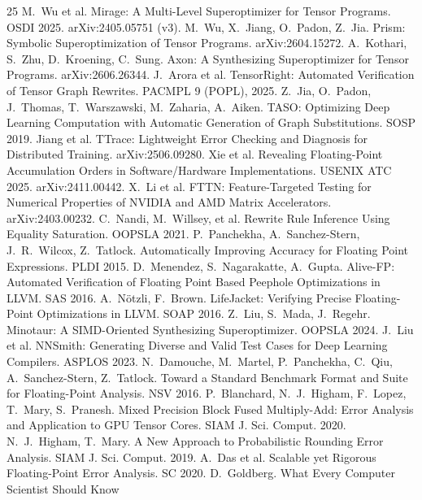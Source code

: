 \documentclass[twocolumn,10pt]{article}
\begin{document}
\begin{thebibliography}{25}
 M.~Wu et al. Mirage: A Multi-Level Superoptimizer for
Tensor Programs. OSDI 2025. arXiv:2405.05751 (v3).
 M.~Wu, X.~Jiang, O.~Padon, Z.~Jia. Prism: Symbolic
Superoptimization of Tensor Programs. arXiv:2604.15272.
 A.~Kothari, S.~Zhu, D.~Kroening, C.~Sung. Axon: A
Synthesizing Superoptimizer for Tensor Programs. arXiv:2606.26344.
 J.~Arora et al. TensorRight: Automated Verification
of Tensor Graph Rewrites. PACMPL 9 (POPL), 2025.
 Z.~Jia, O.~Padon, J.~Thomas, T.~Warszawski, M.~Zaharia,
A.~Aiken. TASO: Optimizing Deep Learning Computation with Automatic
Generation of Graph Substitutions. SOSP 2019.
 Jiang et al. TTrace: Lightweight Error Checking and
Diagnosis for Distributed Training. arXiv:2506.09280.
 Xie et al. Revealing Floating-Point Accumulation Orders in
Software/Hardware Implementations. USENIX ATC 2025. arXiv:2411.00442.
 X.~Li et al. FTTN: Feature-Targeted Testing for Numerical
Properties of NVIDIA and AMD Matrix Accelerators. arXiv:2403.00232.
 C.~Nandi, M.~Willsey, et al. Rewrite Rule Inference Using
Equality Saturation. OOPSLA 2021.
 P.~Panchekha, A.~Sanchez-Stern, J.~R.~Wilcox, Z.~Tatlock.
Automatically Improving Accuracy for Floating Point Expressions. PLDI 2015.
 D.~Menendez, S.~Nagarakatte, A.~Gupta. Alive-FP:
Automated Verification of Floating Point Based Peephole Optimizations in
LLVM. SAS 2016.
 A.~N\"otzli, F.~Brown. LifeJacket: Verifying Precise
Floating-Point Optimizations in LLVM. SOAP 2016.
 Z.~Liu, S.~Mada, J.~Regehr. Minotaur: A SIMD-Oriented
Synthesizing Superoptimizer. OOPSLA 2024.
 J.~Liu et al. NNSmith: Generating Diverse and Valid Test
Cases for Deep Learning Compilers. ASPLOS 2023.
 N.~Damouche, M.~Martel, P.~Panchekha, C.~Qiu,
A.~Sanchez-Stern, Z.~Tatlock. Toward a Standard Benchmark Format and Suite
for Floating-Point Analysis. NSV 2016.
 P.~Blanchard, N.~J.~Higham, F.~Lopez, T.~Mary,
S.~Pranesh. Mixed Precision Block Fused Multiply-Add: Error Analysis and
Application to GPU Tensor Cores. SIAM J. Sci. Comput. 2020.
 N.~J.~Higham, T.~Mary. A New Approach to
Probabilistic Rounding Error Analysis. SIAM J. Sci. Comput. 2019.
 A.~Das et al. Scalable yet Rigorous Floating-Point Error
Analysis. SC 2020.
 D.~Goldberg. What Every Computer Scientist Should Know

\end{thebibliography}
\end{document}
